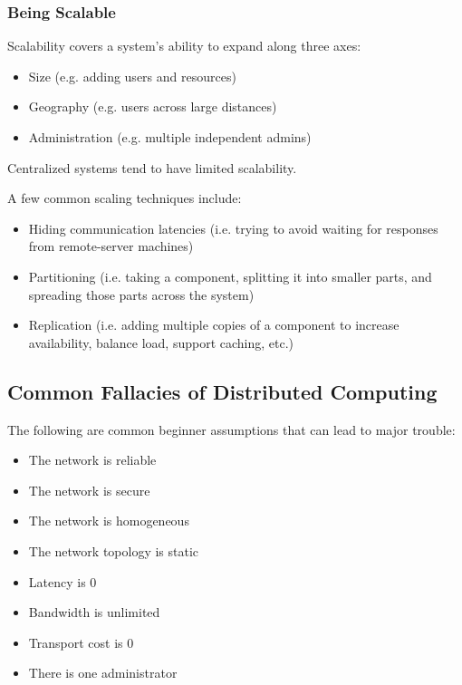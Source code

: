 \documentclass[12pt,titlepage]{article}
\begin{document}
      \subsubsection{Being Scalable}
        Scalability covers a system's ability to expand along three axes:
        \begin{itemize}
          \item Size (e.g. adding users and resources)
          \item Geography (e.g. users across large distances)
          \item Administration (e.g. multiple independent admins)
        \end{itemize}
        Centralized systems tend to have limited scalability.

        A few common scaling techniques include:
        \begin{itemize}
          \item Hiding communication latencies (i.e. trying to avoid waiting for responses from remote-server machines)
          \item Partitioning (i.e. taking a component, splitting it into smaller parts, and spreading those parts across the system)
          \item Replication (i.e. adding multiple copies of a component to increase availability, balance load, support caching, etc.)
        \end{itemize}

      \subsection{Common Fallacies of Distributed Computing}
        The following are common beginner assumptions that can lead to major trouble:
        \begin{itemize}
          \item The network is reliable
          \item The network is secure
          \item The network is homogeneous
          \item The network topology is static
          \item Latency is 0
          \item Bandwidth is unlimited
          \item Transport cost is 0
          \item There is one administrator
        \end{itemize}
\end{document}
